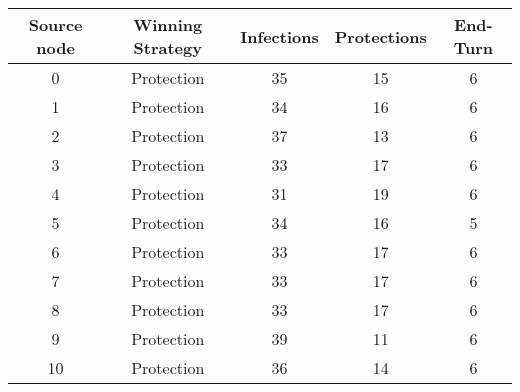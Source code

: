 \documentclass[results.tex]{subfiles}
\begin{document}
    \begin{center}
        \begin{tabular}{| c || c | c | c | c |}
            \hline
            {\bfseries Source node} & {\bfseries Winning Strategy} & {\bfseries Infections} & {\bfseries Protections}
            & {\bfseries End-Turn}
            \\  %
            \hline\hline
            0                       & Protection                   & 35                     & 15                      & 6                    \\
            \hline
            1                       & Protection                   & 34                     & 16                      & 6                    \\
            \hline
            2                       & Protection                   & 37                     & 13                      & 6                    \\
            \hline
            3                       & Protection                   & 33                     & 17                      & 6                    \\
            \hline
            4                       & Protection                   & 31                     & 19                      & 6                    \\
            \hline
            5                       & Protection                   & 34                     & 16                      & 5                    \\
            \hline
            6                       & Protection                   & 33                     & 17                      & 6                    \\
            \hline
            7                       & Protection                   & 33                     & 17                      & 6                    \\
            \hline
            8                       & Protection                   & 33                     & 17                      & 6                    \\
            \hline
            9                       & Protection                   & 39                     & 11                      & 6                    \\
            \hline
            10                      & Protection                   & 36                     & 14                      & 6                    \\

\end{tabular}
\end{center}
\end{document}
